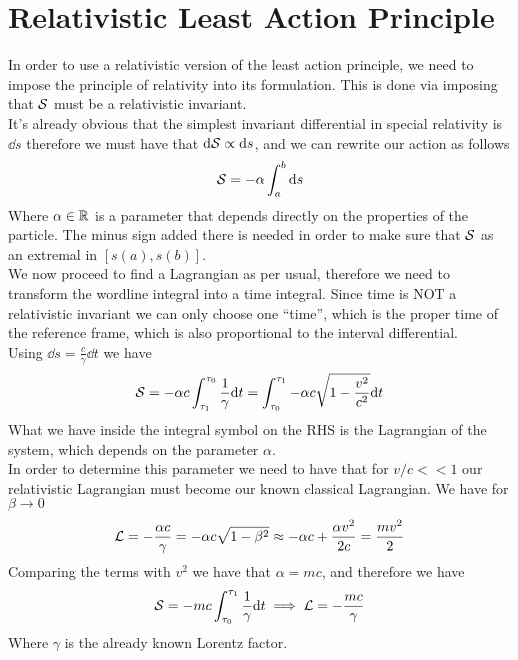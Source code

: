 \documentclass[../admech.tex]{subfiles}
\begin{document}
\section{Relativistic Least Action Principle}
In order to use a relativistic version of the least action principle, we need to impose the principle of relativity into its formulation. This is done via imposing that $\mathcal{S}$ must be a relativistic invariant.\\
It's already obvious that the simplest invariant differential in special relativity is $\dd s$ therefore we must have that $\dd\mathcal{S}\propto\dd s$, and we can rewrite our action as follows
\begin{equation}
	\mathcal{S}=-\alpha\int_{a}^{b}\dd s
	\label{eq:relact}
\end{equation}
Where $\alpha\in\operatorname{\mathbb{R}}$ is a parameter that depends directly on the properties of the particle. The minus sign added there is needed in order to make sure that $\mathcal{S}$ as an extremal in $[s(a),s(b)]$.\\
We now proceed to find a Lagrangian as per usual, therefore we need to transform the wordline integral into a time integral. Since time is NOT a relativistic invariant we can only choose one ``time'', which is the proper time of the reference frame, which is also proportional to the interval differential.\\
Using $\dd s=\frac{c}{\gamma}\dd t$ we have
\begin{equation}
	\mathcal{S}=-\alpha c\int_{\tau_1}^{\tau_0}\frac{1}{\gamma}\dd t=\int_{\tau_0}^{\tau_1}-\alpha c\sqrt{1-\frac{v^2}{c^2}}\dd t
	\label{eq:actpropt}
\end{equation}
What we have inside the integral symbol on the RHS is the Lagrangian of the system, which depends on the parameter $\alpha$.\\
In order to determine this parameter we need to have that for $v/c<<1$ our relativistic Lagrangian must become our known classical Lagrangian. We have for $\beta\to0$
\begin{equation}
	\mathcal{L}=-\frac{\alpha c}{\gamma}=-\alpha c\sqrt{1-\beta^2}\approx-\alpha c+\frac{\alpha v^2}{2c}=\frac{mv^2}{2}
	\label{eq:lagapprox}
\end{equation}
Comparing the terms with $v^2$ we have that $\alpha=mc$, and therefore we have
\begin{equation}
	\mathcal{S}=-mc\int_{\tau_0}^{\tau_1}\frac{1}{\gamma}\dd t\implies\mathcal{L}=-\frac{mc}{\gamma}
	\label{eq:relaction}
\end{equation}
Where $\gamma$ is the already known Lorentz factor.
\end{document}
